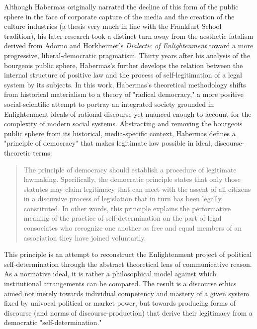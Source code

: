 Although Habermas originally narrated the decline of this form of the public sphere in the face of corporate capture of the media and the creation of the culture industries (a thesis very much in line with the Frankfurt School tradition), his later research took a distinct turn away from the aesthetic fatalism derived from Adorno and Horkheimer's \emph{Dialectic of Enlightenment} toward a more progressive, liberal-democratic pragmatism. Thirty years after his analysis of the bourgeois public sphere, Habermas's  further develops the relation between the internal structure of positive law and the process of self-legitimation of a legal system by its subjects. In this work, Habermas's theoretical methodology shifts from historical materialism to a theory of "radical democracy," a more positive social-scientific attempt to portray an integrated society grounded in Enlightenment ideals of rational discourse yet nuanced enough to account for the complexity of modern social systems. Abstracting and removing the bourgeois public sphere from its historical, media-specific context, Habermas defines a "principle of democracy" that makes legitimate law possible in ideal, discourse-theoretic terms:
\blockcquote[110]{Habermas-bfn}{
  The principle of democracy should establish a procedure of legitimate lawmaking. Specifically, the democratic principle states that only those statutes may claim legitimacy that can meet with the assent of all citizens in a discursive process of legislation that in turn has been legally constituted. In other words, this principle explains the performative meaning of the practice of self-determination on the part of legal consociates who recognize one another as free and equal members of an association they have joined voluntarily.
}
This principle is an attempt to reconstruct the Enlightenment project of political self-determination through the abstract theoretical lens of communicative reason. As a normative ideal, it is rather a philosophical model against which institutional arrangements can be compared. The result is a discourse ethics aimed not merely towards individual competency and mastery of a given system fixed by univocal political or market power, but towards producing forms of discourse (and norms of discourse-production) that derive their legitimacy from a democratic "self-determination."
